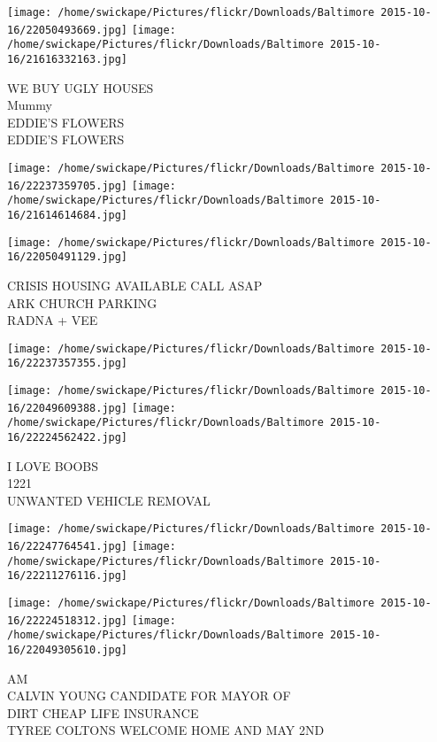 \documentclass[10pt,letterpaper]{article}
\begin{document}
\texttt{[image: /home/swickape/Pictures/flickr/Downloads/Baltimore 2015-10-16/22050493669.jpg]}
\texttt{[image: /home/swickape/Pictures/flickr/Downloads/Baltimore 2015-10-16/21616332163.jpg]}

WE BUY UGLY HOUSES\\
Mummy\\
EDDIE'S FLOWERS\\
EDDIE'S FLOWERS\\
\pagebreak

\texttt{[image: /home/swickape/Pictures/flickr/Downloads/Baltimore 2015-10-16/22237359705.jpg]}
\texttt{[image: /home/swickape/Pictures/flickr/Downloads/Baltimore 2015-10-16/21614614684.jpg]}

\texttt{[image: /home/swickape/Pictures/flickr/Downloads/Baltimore 2015-10-16/22050491129.jpg]}

CRISIS HOUSING AVAILABLE CALL ASAP\\
ARK CHURCH PARKING\\
RADNA + VEE\\
\pagebreak

\texttt{[image: /home/swickape/Pictures/flickr/Downloads/Baltimore 2015-10-16/22237357355.jpg]}

\vspace{0.25in}
\texttt{[image: /home/swickape/Pictures/flickr/Downloads/Baltimore 2015-10-16/22049609388.jpg]}
\texttt{[image: /home/swickape/Pictures/flickr/Downloads/Baltimore 2015-10-16/22224562422.jpg]}

I LOVE BOOBS\\
1221\\
UNWANTED VEHICLE REMOVAL\\
\pagebreak

\texttt{[image: /home/swickape/Pictures/flickr/Downloads/Baltimore 2015-10-16/22247764541.jpg]}
\texttt{[image: /home/swickape/Pictures/flickr/Downloads/Baltimore 2015-10-16/22211276116.jpg]}

\texttt{[image: /home/swickape/Pictures/flickr/Downloads/Baltimore 2015-10-16/22224518312.jpg]}
\texttt{[image: /home/swickape/Pictures/flickr/Downloads/Baltimore 2015-10-16/22049305610.jpg]}

AM\\
CALVIN YOUNG CANDIDATE FOR MAYOR OF\\
DIRT CHEAP LIFE INSURANCE\\
TYREE COLTONS WELCOME HOME AND MAY 2ND\\
\pagebreak
\end{document}
